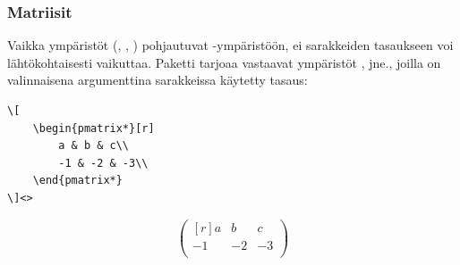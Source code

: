 \begin{fframe}
    \frametitle{Matriisit}
    Vaikka ympäristöt  (, , ) pohjautuvat -ympäristöön, ei sarakkeiden tasaukseen voi lähtökohtaisesti vaikuttaa. \vaihto Paketti  tarjoaa vastaavat ympäristöt ,  jne., joilla on valinnaisena argumenttina sarakkeissa käytetty tasaus:\vaihto
    \pause

    \begin{minipage}{5cm}
        \begin{lstlisting}
\[
    \begin{pmatrix*}[r]
        a & b & c\\
        -1 & -2 & -3\\
    \end{pmatrix*}
\]<>
        \end{lstlisting}
    \end{minipage}
    \begin{minipage}{5cm}
        \[
            \begin{pmatrix*}[r]
                a & b & c\\
                -1 & -2 & -3\\
            \end{pmatrix*}
        \]
    \end{minipage}
\end{fframe}

